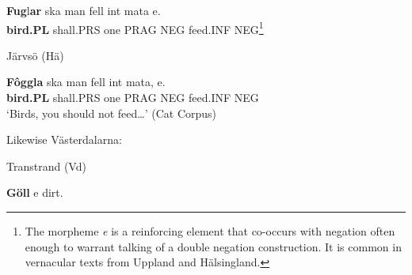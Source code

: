 
 \ea\label{}
\gll \textbf{Fug}l\textbf{ar} ska  man  fell  int  mata  e.\\


\textbf{bird.PL} shall.PRS  one  PRAG  NEG  feed.INF  NEG\footnote{ The morpheme \textit{e} is a reinforcing element that co-occurs with negation often enough to warrant talking of a double negation construction. It is common in vernacular texts from Uppland and Hälsingland.}\\

\item 

Järvsö (Hä)



 \ea\label{}
\gll \textbf{Fôggla} ska  man  fell  int  mata,  e.\\


\textbf{bird.PL} shall.PRS  one  PRAG  NEG  feed.INF  NEG\\

\glt ‘Birds, you should not feed…’ (Cat Corpus)

\z

Likewise Västerdalarna:


\item 

Transtrand (Vd) 



\item 


 \ea\label{}
\gll \textbf{Göll} e  dirt.\\



